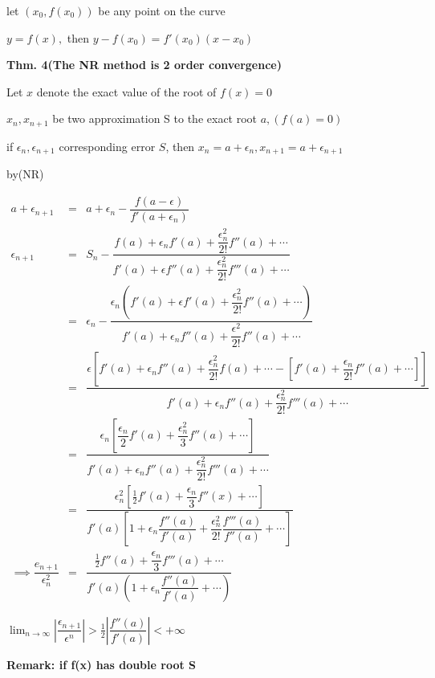 let $(x_0,f(x_0))$ be any point on the curve

$y = f(x),$ then $y-f(x_0) = f'(x_0)(x-x_0)$

\textbf{Thm. 4(The NR method is 2 order convergence)}

\begin{tcolorbox}
	Let $x$ denote the exact value of the root of $f(x) = 0$
	
	$x_n,x_{n+1}$ be two approximation S to the exact root $a,(f(a) = 0)$
	
	if $\epsilon_n,\epsilon_{n+1}$ corresponding error $S$, then $x_n = a + \epsilon_n, x_{n+1} = a + \epsilon_{n+1}$
	
	by(NR)
	
	\begin{eqnarray*}
		a + \epsilon_{n+1} &=& a + \epsilon_n - \dfrac{f(a-\epsilon)}{f'(a+\epsilon_n)} 
		\\
		\epsilon_{n+1} &=& S_n - \dfrac{f(a)+\epsilon_nf'(a)+\dfrac{\epsilon_n^2}{2!}f''(a)+\cdots}{f'(a)+\epsilon f''(a)+\dfrac{\epsilon_n^2}{2!}f'''(a)+\cdots}
		\\
		&=&\epsilon_n - \dfrac{\epsilon_n\left(f'(a)+\epsilon f'(a)+\dfrac{\epsilon_n^2}{2!}f''(a)+\cdots\right)}{f'(a)+\epsilon_n f''(a) + \dfrac{\epsilon^2}{2!}f''(a)+\cdots}
		\\
		&=&\dfrac{\epsilon[f'(a)+\epsilon_nf''(a)+\dfrac{\epsilon_n^2}{2!}f(a)+\cdots-[f'(a)+\dfrac{\epsilon_n}{2!}f''(a)+\cdots]]}{f'(a)+\epsilon_nf''(a)+\dfrac{\epsilon_n^2}{2!}f'''(a)+\cdots}
		\\
		&=&\dfrac{\epsilon_n[\dfrac{\epsilon_n}{2}f'(a)+\dfrac{\epsilon^2_n}{3}f''(a)+\cdots]}{f'(a)+\epsilon_n f''(a)+\dfrac{\epsilon^2_n}{2!}f'''(a)+\cdots}
		\\
		&=&\dfrac{\epsilon_n^2[\frac{1}{2}f'(a)+\dfrac{\epsilon_n}{3}f''(x)+\cdots]}{f'(a)[1+\epsilon_n\dfrac{f''(a)}{f'(a)}+\dfrac{\epsilon_n^2}{2!}\dfrac{f'''(a)}{f''(a)}+\cdots]}
		\\
		\implies \dfrac{e_{n+1}}{\epsilon_n^2} &=& \dfrac{\frac{1}{2}f''(a)+\dfrac{\epsilon_n}{3}f'''(a) + \cdots}{f'(a)(1+\epsilon_n\dfrac{f''(a)}{f'(a)}+\cdots)}
	\end{eqnarray*}
	
	$\lim_{n \rightarrow \infty}|\dfrac{\epsilon_{n+1}}{\epsilon^n}| > \frac{1}{2}|\dfrac{f''(a)}{f'(a)}| < + \infty$
	
	\textbf{Remark: if f(x) has double root S}
	
	
\end{tcolorbox}

